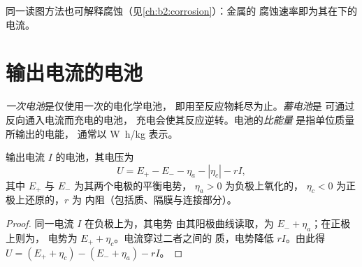 同一读图方法也可解释腐蚀（见\cref{ch:b2:corrosion}）：金属的
腐蚀速率即为其在下的电流。

\section{输出电流的电池}

\begin{definition}[电池]\label{def:b2:batteries-electrolysis:battery}
\emph{一次电池}是仅使用一次的电化学电池，
即用至反应物耗尽为止。\emph{蓄电池}是
可通过反向通入电流而充电的电池，
充电会使其反应逆转。电池的\emph{比能量}
是指单位质量所输出的电能，
通常以 \unit{W.h/kg} 表示。
\end{definition}

\begin{proposition}[输出电流时电池的电压]\label{prop:b2:batteries-electrolysis:delivering}
输出电流 $I$ 的电池，其电压为
\[
  U = E_+ - E_- - \eta_a - |\eta_c| - rI ,
\]
其中 $E_+$ 与 $E_-$ 为其两个电极的平衡电势，
$\eta_a > 0$ 为负极上氧化的，
$\eta_c < 0$ 为正极上还原的，$r$ 为
内阻（包括质、隔膜与连接部分）。
\end{proposition}

\begin{proof}
同一电流 $I$ 在负极上为，其电势
由其阳极曲线读取，为 $E_- + \eta_a$；在正极上则为，
电势为 $E_+ + \eta_c$。电流穿过二者之间的
质，电势降低 $rI$。由此得 $U = (E_+ + \eta_c) - (E_- +
\eta_a) - rI$。
\end{proof}

